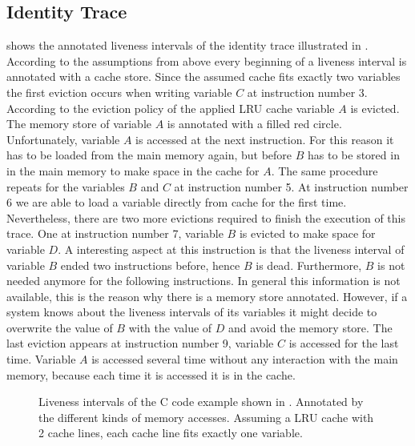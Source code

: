 \documentclass[onecolumn, openright, master, english, signatures]{dbrgrptt}
\begin{document}
\subsection{Identity Trace}
 shows the annotated liveness intervals of the identity \ac{trace} illustrated in .
According to the assumptions from above every beginning of a liveness interval is annotated with a cache store.
Since the assumed cache fits exactly two variables the first eviction occurs when writing variable $C$ at instruction number 3.
According to the eviction policy of the applied \ac{LRU} cache variable $A$ is evicted.
The memory store of variable $A$ is annotated with a filled red circle.
Unfortunately, variable $A$ is accessed at the next instruction.
For this reason it has to be loaded from the main memory again, but before $B$ has to be stored in in the main memory to make space in the cache for $A$.
The same procedure repeats for the variables $B$ and $C$ at instruction number 5.
At instruction number 6 we are able to load a variable directly from cache for the first time.
Nevertheless, there are two more evictions required to finish the execution of this trace.
One at instruction number 7, variable $B$ is evicted to make space for variable $D$.
A interesting aspect at this instruction is that the liveness interval of variable $B$ ended two instructions before, hence $B$ is dead.
Furthermore, $B$ is not needed anymore for the following instructions.
In general this information is not available, this is the reason why there is a memory store annotated.
However, if a system knows about the liveness intervals of its variables it might decide to overwrite the value of $B$ with the value of $D$ and avoid the memory store.
The last eviction appears at instruction number 9, variable $C$ is accessed for the last time. Variable $A$ is accessed several time without any interaction with the main memory, because each time it is accessed it is in the cache.

\begin{figure}[!ht]
  \centering
  
  \caption{Liveness intervals of the C code example shown in . Annotated by the different kinds of memory accesses. Assuming a LRU cache with 2 cache lines, each cache line fits exactly one variable.}
  \label{fig:trace-transformation-original-marked}
\end{figure}
\end{document}
